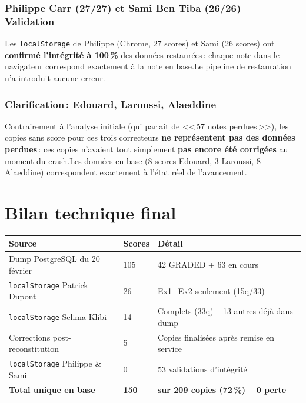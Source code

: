 \documentclass[11pt,a4paper]{article}
\begin{document}
\subsubsection{Philippe Carr (27/27) et Sami Ben Tiba (26/26) -- Validation}

Les \texttt{localStorage} de Philippe (Chrome, 27 scores) et Sami (26 scores) ont \textbf{confirm\'{e} l'int\'{e}grit\'{e} \`{a} 100\,\%} des donn\'{e}es restaur\'{e}es\,: chaque note dans le navigateur correspond exactement \`{a} la note en base.\@ Le pipeline de restauration n'a introduit aucune erreur.

\subsubsection{Clarification\,: Edouard, Laroussi, Alaeddine}

Contrairement \`{a} l'analyse initiale (qui parlait de <<\,57 notes perdues\,>>), les copies sans score pour ces trois correcteurs \textbf{ne repr\'{e}sentent pas des donn\'{e}es perdues}\,: ces copies n'avaient tout simplement \textbf{pas encore \'{e}t\'{e} corrig\'{e}es} au moment du crash.\@ Les donn\'{e}es en base (8 scores Edouard, 3 Laroussi, 8 Alaeddine) correspondent exactement \`{a} l'\'{e}tat r\'{e}el de l'avancement.

\section{Bilan technique final}

\begin{center}
	\renewcommand{\arraystretch}{1.35}
	\begin{tabularx}{\linewidth}{XC{1.6cm}|X|}
		\toprule
		\textbf{\sffamily Source}              & \textbf{\sffamily Scores} & \textbf{\sffamily D\'{e}tail}                      \\
		\midrule
		Dump PostgreSQL du 20 f\'{e}vrier      & 105                       & 42 GRADED + 63 en cours                            \\
		\midrule
		\texttt{localStorage} Patrick Dupont   & 26                        & Ex1+Ex2 seulement (15q/33)                         \\
		\midrule
		\texttt{localStorage} Selima Klibi     & 14                        & Complets (33q) -- 13 autres d\'{e}j\`{a} dans dump \\
		\midrule
		Corrections post-reconstitution        & 5                         & Copies finalis\'{e}es apr\`{e}s remise en service  \\
		\midrule
		\texttt{localStorage} Philippe \& Sami & 0                         & 53 validations d'int\'{e}grit\'{e}                 \\
		\midrule
		\textbf{Total unique en base}          & \textbf{150}              & \textbf{sur 209 copies (72\,\%) -- 0 perte}        \\
		\bottomrule
	\end{tabularx}
\end{center}
\end{document}
